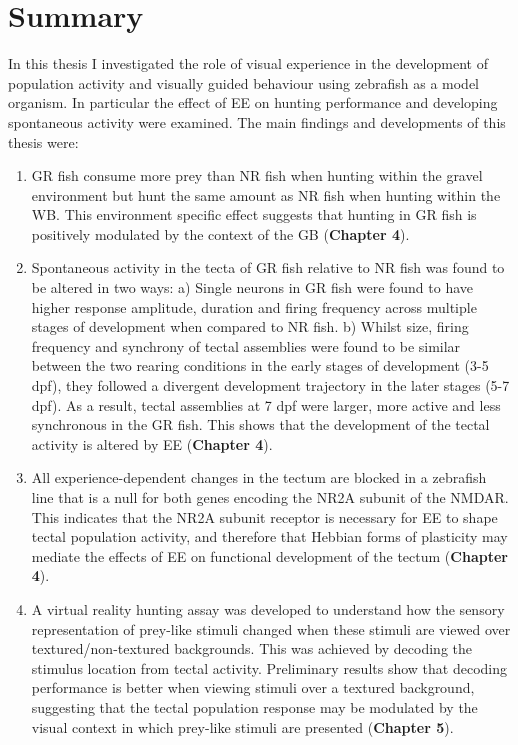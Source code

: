 \section{Summary}
In this thesis I investigated the role of visual experience in the development of population activity and visually guided behaviour using zebrafish as a model organism. In particular the effect of EE on hunting performance and developing spontaneous activity were examined. The main findings and developments of this thesis were:
\begin{enumerate}
    \item GR fish consume more prey than NR fish when hunting within the gravel environment but hunt the same amount as NR fish when hunting within the WB.  This environment specific effect suggests that hunting in GR fish is positively modulated by the context of the GB (\textbf{Chapter 4}).
    
    \item Spontaneous activity in the tecta of GR fish relative to NR fish was found to be altered in two ways: a) Single neurons in GR fish were found to have higher response amplitude, duration and firing frequency across multiple stages of development when compared to NR fish. b) Whilst size, firing frequency and synchrony of tectal assemblies were found to be similar between the two rearing conditions in the early stages of development (3-5 dpf), they followed a divergent development trajectory in the later stages (5-7 dpf). As a result, tectal assemblies at 7 dpf were larger, more active and less synchronous in the GR fish.  This shows that the development of the tectal activity is altered by EE (\textbf{Chapter 4}).
    
    \item All experience-dependent changes in the tectum are blocked in a zebrafish line that is a null for both genes encoding the NR2A subunit of the NMDAR. This indicates that the NR2A subunit receptor is necessary for EE to shape tectal population activity, and therefore that Hebbian forms of plasticity may mediate the effects of EE on functional development of the tectum (\textbf{Chapter 4}).
    
    \item A virtual reality hunting assay was developed to understand how the sensory representation of prey-like stimuli changed when these stimuli are viewed over textured/non-textured backgrounds. This was achieved by decoding the stimulus location from tectal activity. Preliminary results show that decoding performance is better when viewing stimuli over a textured background, suggesting that the tectal population response may be modulated by the visual context in which prey-like stimuli are presented (\textbf{Chapter 5}).
\end{enumerate}



